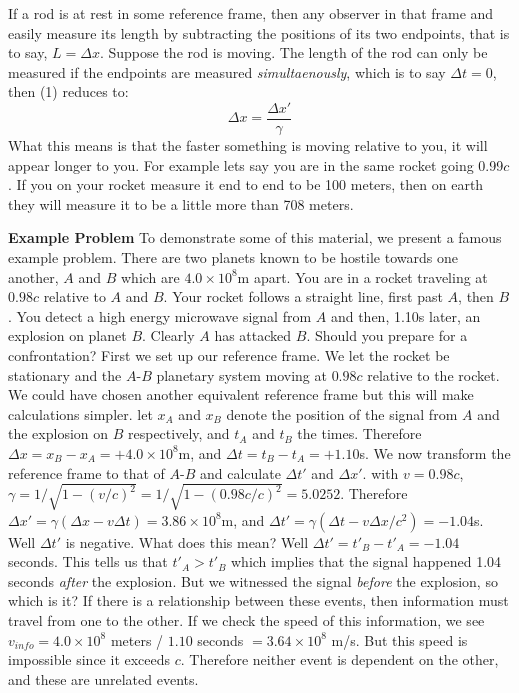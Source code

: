 \documentclass[conference]{IEEEtran}
\begin{document}
If a rod is at rest in some reference frame, then any observer in that frame and easily measure its length by subtracting the positions of its two endpoints, that is to say, $L = \Delta x$. Suppose the rod is moving. The length of the rod can only be measured if the endpoints are measured \textit{simultaenously}, which is to say $\Delta t = 0$, then (1) reduces to: 
\begin{equation}
\Delta x = \frac{\Delta x'}{\gamma}
\end{equation}
What this means is that the faster something is moving relative to you, it will appear longer to you. For example lets say you are in the same rocket going 0.99$c$. If you on your rocket measure it end to end to be 100 meters, then on earth they will measure it to be a little more than 708 meters.

\textbf{Example Problem} To demonstrate some of this material, we present a famous example problem. There are two planets known to be hostile towards one another, $A$ and $B$ which are $4.0 \times 10^8 $m apart. You are in a rocket traveling at $0.98c$ relative to $A$ and $B$. Your rocket follows a straight line, first past $A$, then $B$. You detect a high energy microwave signal from $A$ and then, 1.10s later, an explosion on planet $B$. Clearly $A$ has attacked $B$. Should you prepare for a confrontation? First we set up our reference frame. We let the rocket be stationary and the $A$-$B$ planetary system moving at $0.98c$ relative to the rocket. We could have chosen another equivalent reference frame but this will make calculations simpler. let $x_A$ and $x_B$ denote the position of the signal from $A$ and the explosion on $B$ respectively, and $t_A$ and $t_B$ the times. Therefore $\Delta x = x_B - x_A = +4.0 \times 10^8$m, and $\Delta t = t_B - t_A = +1.10$s. We now transform the reference frame to that of $A$-$B$ and calculate $\Delta t'$ and $\Delta x'$. with $v = 0.98c$, $\gamma = 1/\sqrt{1-(v/c)^2} = 1/\sqrt{1-(0.98c/c)^2} = 5.0252$. Therefore $\Delta x' = \gamma(\Delta x - v\Delta t) = 3.86 \times 10^8$m, and $\Delta t' = \gamma (\Delta t - v\Delta x/c^2) = -1.04$s. Well $\Delta t'$ is negative. What does this mean? Well $\Delta t' = t'_B - t'_A = -1.04$ seconds. This tells us that $t'_A > t'_B$ which implies that the signal happened 1.04 seconds \textit{after} the explosion. But we witnessed the signal \textit{before} the explosion, so which is it? If there is a relationship between these events, then information must travel from one to the other. If we check the speed of this information, we see $v_{info} = 4.0 \times 10^8$ meters / $1.10$ seconds $ = 3.64 \times 10^8$ m/s. But this speed is impossible since it exceeds $c$. Therefore neither event is dependent on the other, and these are unrelated events. 
\end{document}
